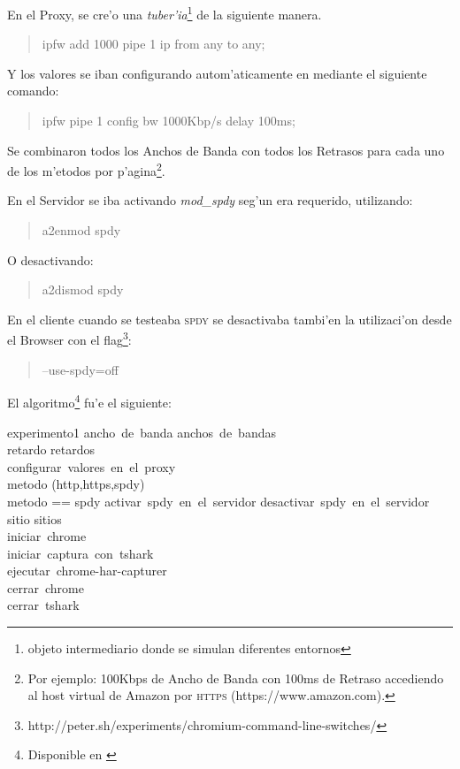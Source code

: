 \documentclass[a4paper,11pt,twocolumn]{article}
\begin{document}
En el Proxy, se cre'o una \emph{tuber'ia}\footnote{objeto intermediario donde se simulan diferentes entornos} de la siguiente manera.

\begin{quote}\small
ipfw add 1000 pipe 1 ip from any to any;
\end{quote}

Y los valores se iban configurando autom'aticamente en mediante el siguiente comando:

\begin{quote}\small
ipfw pipe 1 config bw 1000Kbp/s delay 100ms;
\end{quote}

Se combinaron todos los Anchos de Banda con todos los Retrasos para cada uno de los m'etodos por p'agina\footnote{Por ejemplo: 100Kbps de Ancho de Banda con 100ms de Retraso accediendo al host virtual de Amazon por \textsc{https} (https://www.amazon.com).}.

En el Servidor se iba activando \emph{mod\_spdy} seg'un era requerido, utilizando:

\begin{quote}\small
a2enmod spdy
\end{quote}

O desactivando:

\begin{quote}\small
a2dismod spdy
\end{quote}

En el cliente cuando se testeaba \textsc{spdy} se desactivaba tambi'en la utilizaci'on desde el Browser con el flag\footnote{http://peter.sh/experiments/chromium-command-line-switches/}:

\begin{quote}\small
--use-spdy=off
\end{quote}

El algoritmo\footnote{Disponible en \cite[exp1.sh]{spdy-tests}} fu'e el siguiente:

\begin{pseudocode}{experimento1}{ }
\FOR ancho\ de\ banda \in anchos\ de\ bandas \DO \\
	\BEGIN
	\FOR retardo \in retardos \DO \\
		\BEGIN
			configurar\ valores\ en\ el\ proxy \\
			\FOR metodo \in (http,https,spdy) \DO \\
				\BEGIN
					\IF metodo == spdy
					\THEN
						activar\ spdy\ en\ el\ servidor
					\ELSE
						desactivar\ spdy\ en\ el\ servidor\\
					\FOR sitio \in sitios \DO \\
					\BEGIN
						iniciar\ chrome\\
						iniciar\ captura\ con\ tshark\\
						ejecutar\ chrome-har-capturer\\
						cerrar\ chrome\\
						cerrar\ tshark
					\END
				\END
		\END
	\END
\end{pseudocode}
\end{document}
